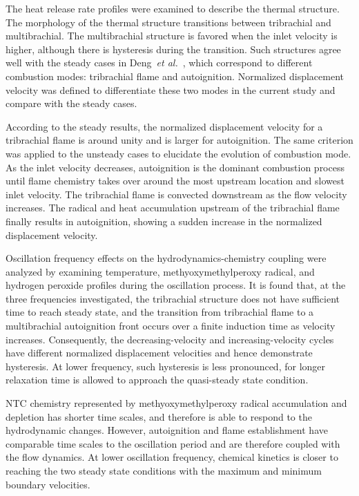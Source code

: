 \documentclass[review,3p,times]{elsarticle}
\begin{document}
The heat release rate profiles were examined to describe the thermal structure.  The morphology of the thermal structure transitions between tribrachial and multibrachial.  The multibrachial structure is favored when the inlet velocity is higher, although there is hysteresis during the transition.  Such structures agree well with the steady cases in Deng~\emph{et al.}~\cite{deng15b}, which correspond to different combustion modes: tribrachial flame and autoignition.  Normalized displacement velocity was defined to differentiate these two modes in the current study and compare with the steady cases.  

According to the steady results, the normalized displacement velocity for a tribrachial flame is around unity and is larger for autoignition.  The same criterion was applied to the unsteady cases to elucidate the evolution of combustion mode.  As the inlet velocity decreases, autoignition is the dominant combustion process until flame chemistry takes over around the most upstream location and slowest inlet velocity.  The tribrachial flame is convected downstream as the flow velocity increases.  The radical and heat accumulation upstream of the tribrachial flame finally results in autoignition, showing a sudden increase in the normalized displacement velocity.  

\textcolor{Rev1}{Oscillation frequency effects on the hydrodynamics-chemistry coupling were analyzed by examining temperature, methyoxymethylperoxy radical, and hydrogen peroxide profiles during the oscillation process.  It is found that, at the three frequencies investigated, the tribrachial structure does not have sufficient time to reach steady state, and the transition from tribrachial flame to a multibrachial autoignition front occurs over a finite induction time as velocity increases.  Consequently, the decreasing-velocity and increasing-velocity cycles have different normalized displacement velocities and hence demonstrate hysteresis.  At lower frequency, such hysteresis is less pronounced, for longer relaxation time is allowed to approach the quasi-steady state condition.}  

\textcolor{Rev1}{NTC chemistry represented by methyoxymethylperoxy radical accumulation and depletion has shorter time scales, and therefore is able to respond to the hydrodynamic changes.  However, autoignition and flame establishment have comparable time scales to the oscillation period and are therefore coupled with the flow dynamics.  At lower oscillation frequency, chemical kinetics is closer to reaching the two steady state conditions with the maximum and minimum boundary velocities.}
\end{document}
